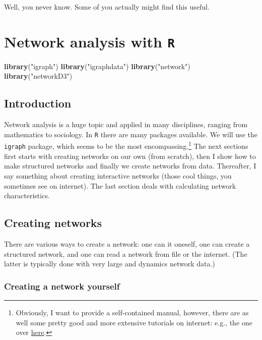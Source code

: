 \documentclass[]{article}
\newenvironment{Shaded}{\begin{snugshade}}{\end{snugshade}}
\newcommand{\KeywordTok}[1]{\textcolor[rgb]{0.13,0.29,0.53}{\textbf{#1}}}
\newcommand{\StringTok}[1]{\textcolor[rgb]{0.31,0.60,0.02}{#1}}
\newcommand{\NormalTok}[1]{#1}
\let\rmarkdownfootnote\footnote%
\def\footnote{\protect\rmarkdownfootnote}
\theoremstyle{definition}
\theoremstyle{definition}
\theoremstyle{definition}
\theoremstyle{remark}
\begin{document}
Well, you never know. Some of you actually might find this useful.

\section{\texorpdfstring{Network analysis with
\texttt{R}}{Network analysis with R}}\label{network-analysis-with-r}

\begin{Shaded}
\begin{Highlighting}[]
\KeywordTok{library}\NormalTok{(}\StringTok{"igraph"}\NormalTok{)}
\KeywordTok{library}\NormalTok{(}\StringTok{"igraphdata"}\NormalTok{)}
\KeywordTok{library}\NormalTok{(}\StringTok{"network"}\NormalTok{)}
\KeywordTok{library}\NormalTok{(}\StringTok{"networkD3"}\NormalTok{)}
\end{Highlighting}
\end{Shaded}

\subsection{Introduction}\label{introduction-1}

Network analysis is a huge topic and applied in many disciplines,
ranging from mathematics to sociology. In \texttt{R} there are many
packages available. We will use the \texttt{igraph} package, which seems
to be the most encompassing.\footnote{Obviously, I want to provide a
  self-contained manual, however, there are as well some pretty good and
  more extensive tutorials on internet: e.g., the one over
  \href{http://kateto.net/networks-r-igraph/}{here}.} The next sections
first starts with creating networks on our own (from scratch), then I
show how to make structured networks and finally we create networks from
data. Thereafter, I say something about creating interactive networks
(those cool things, you sometimes see on internet). The last section
deals with calculating network characteristics.

\subsection{Creating networks}\label{creating-networks}

There are various ways to create a network: one can it oneself, one can
create a structured network, and one can read a network from file or the
internet. (The latter is typically done with very large and dynamics
network data.)

\subsubsection{Creating a network
yourself}\label{creating-a-network-yourself}
\end{document}
